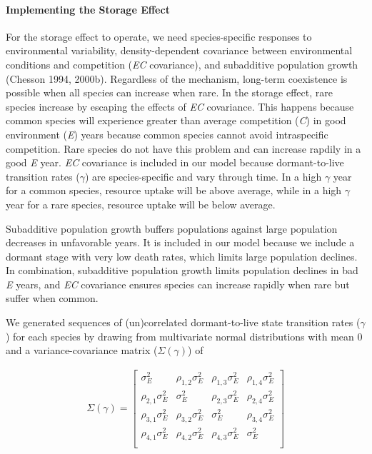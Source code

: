 \documentclass[12pt,]{article}
\begin{document}
\paragraph{Implementing the Storage
Effect}\label{implementing-the-storage-effect}

For the storage effect to operate, we need species-specific responses to
environmental variability, density-dependent covariance between
environmental conditions and competition (\emph{EC} covariance), and
subadditive population growth (Chesson 1994, 2000b). Regardless of the
mechanism, long-term coexistence is possible when all species can
increase when rare. In the storage effect, rare species increase by
escaping the effects of \emph{EC} covariance. This happens because
common species will experience greater than average competition
(\emph{C}) in good environment (\emph{E}) years because common species
cannot avoid intraspecific competition. Rare species do not have this
problem and can increase rapdily in a good \emph{E} year. \emph{EC}
covariance is included in our model because dormant-to-live transition
rates (\(\gamma\)) are species-specific and vary through time. In a high
\(\gamma\) year for a common species, resource uptake will be above
average, while in a high \(\gamma\) year for a rare species, resource
uptake will be below average.

Subadditive population growth buffers populations against large
population decreases in unfavorable years. It is included in our model
because we include a dormant stage with very low death rates, which
limits large population declines. In combination, subadditive population
growth limits population declines in bad \emph{E} years, and \emph{EC}
covariance ensures species can increase rapidly when rare but suffer
when common.

We generated sequences of (un)correlated dormant-to-live state
transition rates (\(\gamma\)) for each species by drawing from
multivariate normal distributions with mean 0 and a variance-covariance
matrix (\(\Sigma(\gamma)\)) of

\begin{align}
\Sigma(\gamma) = 
\begin{bmatrix}
\sigma^2_{E} & \rho_{1,2}\sigma^2_{E} & \rho_{1,3}\sigma^2_{E} & \rho_{1,4}\sigma^2_{E} \\
\rho_{2,1}\sigma^2_{E} & \sigma^2_{E} & \rho_{2,3}\sigma^2_{E} & \rho_{2,4}\sigma^2_{E} \\
\rho_{3,1}\sigma^2_{E} & \rho_{3,2}\sigma^2_{E} & \sigma^2_{E}  & \rho_{3,4}\sigma^2_{E} \\
\rho_{4,1}\sigma^2_{E} & \rho_{4,2}\sigma^2_{E} & \rho_{4,3}\sigma^2_{E} & \sigma^2_{E}  \\
\end{bmatrix}
\end{align}
\end{document}
